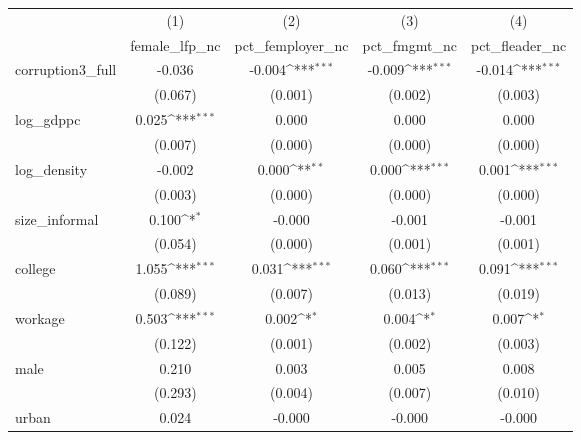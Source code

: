 {
\def\sym#1{\ifmmode^{#1}\else\(^{#1}\)\fi}
\begin{tabular}{l*{4}{c}}
\hline\hline
            &\multicolumn{1}{c}{(1)}&\multicolumn{1}{c}{(2)}&\multicolumn{1}{c}{(3)}&\multicolumn{1}{c}{(4)}\\
            &\multicolumn{1}{c}{female\_lfp\_nc}&\multicolumn{1}{c}{pct\_femployer\_nc}&\multicolumn{1}{c}{pct\_fmgmt\_nc}&\multicolumn{1}{c}{pct\_fleader\_nc}\\
\hline
corruption3\_full&      -0.036         &      -0.004\sym{***}&      -0.009\sym{***}&      -0.014\sym{***}\\
            &     (0.067)         &     (0.001)         &     (0.002)         &     (0.003)         \\
[1em]
log\_gdppc   &       0.025\sym{***}&       0.000         &       0.000         &       0.000         \\
            &     (0.007)         &     (0.000)         &     (0.000)         &     (0.000)         \\
[1em]
log\_density &      -0.002         &       0.000\sym{**} &       0.000\sym{***}&       0.001\sym{***}\\
            &     (0.003)         &     (0.000)         &     (0.000)         &     (0.000)         \\
[1em]
size\_informal&       0.100\sym{*}  &      -0.000         &      -0.001         &      -0.001         \\
            &     (0.054)         &     (0.000)         &     (0.001)         &     (0.001)         \\
[1em]
college     &       1.055\sym{***}&       0.031\sym{***}&       0.060\sym{***}&       0.091\sym{***}\\
            &     (0.089)         &     (0.007)         &     (0.013)         &     (0.019)         \\
[1em]
workage     &       0.503\sym{***}&       0.002\sym{*}  &       0.004\sym{*}  &       0.007\sym{*}  \\
            &     (0.122)         &     (0.001)         &     (0.002)         &     (0.003)         \\
[1em]
male        &       0.210         &       0.003         &       0.005         &       0.008         \\
            &     (0.293)         &     (0.004)         &     (0.007)         &     (0.010)         \\
[1em]
urban       &       0.024         &      -0.000         &      -0.000         &      -0.000         \\

\end{tabular}}
